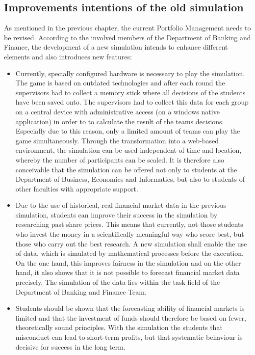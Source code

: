 \subsection{Improvements intentions of the old simulation}
As mentioned in the previous chapter, the current Portfolio Management needs to be revised. According to the involved members of the Department of Banking and Finance, the development of a new simulation intends to enhance different elements and also introduces new features:
\begin{itemize}
  \item Currently, specially configured hardware is necessary to play the simulation. The game is based on outdated technologies and after each round the supervisors had to collect a memory stick where all decisions of the students have been saved onto. The supervisors had to collect this data for each group on a central device with administrative access (on a windows native application) in order to to calculate the result of the teams decisions. Especially due to this reason, only a limited amount of teams can play the game simultaneously. Through the transformation into a web-based environment, the simulation can be used independent of time and location, whereby the number of participants can be scaled. It is therefore also conceivable that the simulation can be offered not only to students at the Department of Business, Economics and Informatics, but also to students of other faculties with appropriate support.
  \item Due to the use of historical, real financial market data in the previous simulation, students can improve their success in the simulation by researching past share prices. This means that currently, not those students who invest the money in a scientifically meaningful way who score best, but those who carry out the best research. A new simulation shall enable the use of data, which is simulated by mathematical processes before the execution. On the one hand, this improves fairness in the simulation and on the other hand, it also shows that it is not possible to forecast financial market data precisely. The simulation of the data lies within the task field of the Department of Banking and Finance Team.
  \item Students should be shown that the forecasting ability of financial markets is limited and that the investment of funds should therefore be based on fewer, theoretically sound principles. With the simulation the students that misconduct can lead to short-term profits, but that systematic behaviour is decisive for success in the long term.
\end{itemize}

